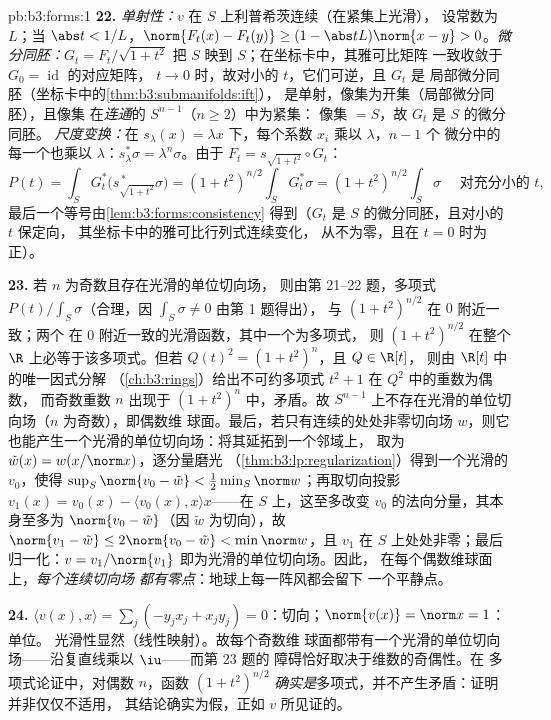 \begin{solution}{pb:b3:forms:1}
\textbf{22.} \emph{单射性：}$v$ 在 $S$ 上利普希茨连续（在紧集上光滑），
设常数为 $L$；当 $\abs t <
1/L$，$\norm{F_t(x) - F_t(y)} \geq (1 - \abs
tL)\norm{x - y} > 0$。\emph{微分同胚：}$G_t =
F_t/\sqrt{1 + t^2}$ 把 $S$ 映到 $S$；在坐标卡中，其雅可比矩阵
一致收敛于 $G_0 = \operatorname{id}$ 的对应矩阵，
$t \to 0$ 时，故对小的 $t$，它们可逆，且 $G_t$ 是
局部微分同胚（坐标卡中的\cref{thm:b3:submanifolds:ift}），
是单射，像集为开集（局部微分同胚），且像集
在\emph{连通}的 $S^{n-1}$（$n \geq 2$）中为紧集：
像集 $= S$，故 $G_t$ 是 $S$ 的微分同胚。
\emph{尺度变换：}在 $s_\lambda(x) = \lambda x$ 下，每个系数
$x_i$ 乘以 $\lambda$，$n - 1$ 个
微分中的每一个也乘以 $\lambda$：$s_\lambda^*\sigma =
\lambda^n\sigma$。由于 $F_t = s_{\sqrt{1+t^2}}\circ G_t$：
\[
P(t) = \int_SG_t^*\bigl(s_{\sqrt{1+t^2}}^{\,*}\sigma\bigr)
= (1 + t^2)^{n/2}\int_SG_t^*\sigma
= (1 + t^2)^{n/2}\int_S\sigma
\quad\text{ 对充分小的 } t,
\]
最后一个等号由\cref{lem:b3:forms:consistency} 得到（$G_t$
是 $S$ 的微分同胚，且对小的 $t$ 保定向，
其坐标卡中的雅可比行列式连续变化，
从不为零，且在 $t = 0$ 时为正）。

\textbf{23.} 若 $n$ 为奇数且存在光滑的单位切向场，
则由第 21--22 题，多项式
$P(t)/\int_S\sigma$（合理，因 $\int_S\sigma \neq 0$ 由第 1 题得出），
与 $(1 + t^2)^{n/2}$ 在 $0$ 附近一致；两个
在 $0$ 附近一致的光滑函数，其中一个为多项式，
则 $(1 + t^2)^{n/2}$ 在整个
$\R$ 上必等于该多项式。但若 $Q(t)^2 = (1 + t^2)^n$，且 $Q \in \R[t]$，
则由 $\R[t]$ 中的唯一因式分解
（\cref{ch:b3:rings}）给出不可约多项式 $t^2 + 1$ 在 $Q^2$ 中的重数为偶数，
而奇数重数 $n$ 出现于
$(1 + t^2)^n$ 中，矛盾。故
$S^{n-1}$ 上不存在光滑的单位切向场（$n$ 为奇数），即偶数维
球面。最后，若只有连续的处处非零切向场
$w$，则它也能产生一个光滑的单位切向场：将其延拓到一个邻域上，
取为 $\tilde w(x) = w(x/\norm x)$，逐分量磨光
（\cref{thm:b3:lp:regularization}）得到一个光滑的
$v_0$，使得 $\sup_S\norm{v_0 - \tilde w} <
\frac12\min_S\norm w$；再取切向投影 $v_1(x) = v_0(x)
- \langle v_0(x), x\rangle x$——在 $S$ 上，这至多改变 $v_0$
的法向分量，其本身至多为 $\norm{v_0 -
\tilde w}$（因 $\tilde w$ 为切向），故 $\norm{v_1 - \tilde
w} \leq 2\norm{v_0 - \tilde w} < \min\norm w$，且 $v_1$
在 $S$ 上处处非零；最后归一化：$v =
v_1/\norm{v_1}$ 即为光滑的单位切向场。因此，
在每个偶数维球面上，\emph{每个连续切向场
都有零点}：地球上每一阵风都会留下
一个平静点。

\textbf{24.} $\langle v(x), x\rangle = \sum_j(-y_jx_j +
x_jy_j) = 0$：切向；$\norm{v(x)} = \norm x = 1$：单位。
光滑性显然（线性映射）。故每个奇数维
球面都带有一个光滑的单位切向场——沿复直线乘以
$\iu$——而第 23 题的
障碍恰好取决于维数的奇偶性。在
多项式论证中，对偶数 $n$，函数 $(1 +
t^2)^{n/2}$ \emph{确实是}多项式，并不产生矛盾：证明
并非仅仅不适用，
其结论确实为假，正如 $v$ 所见证的。


\end{solution}
